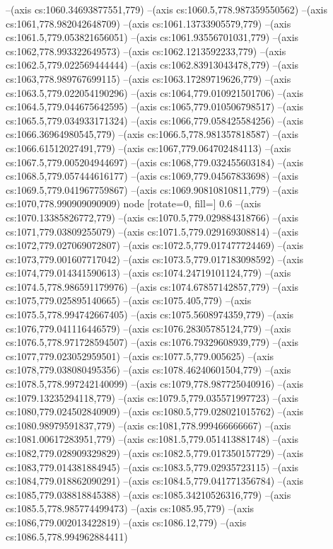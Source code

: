 --(axis cs:1060.34693877551,779)
--(axis cs:1060.5,778.987359550562)
--(axis cs:1061,778.982042648709)
--(axis cs:1061.13733905579,779)
--(axis cs:1061.5,779.053821656051)
--(axis cs:1061.93556701031,779)
--(axis cs:1062,778.993322649573)
--(axis cs:1062.1213592233,779)
--(axis cs:1062.5,779.022569444444)
--(axis cs:1062.83913043478,779)
--(axis cs:1063,778.989767699115)
--(axis cs:1063.17289719626,779)
--(axis cs:1063.5,779.022054190296)
--(axis cs:1064,779.010921501706)
--(axis cs:1064.5,779.044675642595)
--(axis cs:1065,779.010506798517)
--(axis cs:1065.5,779.034933171324)
--(axis cs:1066,779.058425584256)
--(axis cs:1066.36964980545,779)
--(axis cs:1066.5,778.981357818587)
--(axis cs:1066.61512027491,779)
--(axis cs:1067,779.064702484113)
--(axis cs:1067.5,779.005204944697)
--(axis cs:1068,779.032455603184)
--(axis cs:1068.5,779.057444616177)
--(axis cs:1069,779.04567833698)
--(axis cs:1069.5,779.041967759867)
--(axis cs:1069.90810810811,779)
--(axis cs:1070,778.990909090909) node [rotate=0, fill=\bgcol] {0.6}
--(axis cs:1070.13385826772,779)
--(axis cs:1070.5,779.029884318766)
--(axis cs:1071,779.03809255079)
--(axis cs:1071.5,779.029169308814)
--(axis cs:1072,779.027069072807)
--(axis cs:1072.5,779.017477724469)
--(axis cs:1073,779.001607717042)
--(axis cs:1073.5,779.017183098592)
--(axis cs:1074,779.014341590613)
--(axis cs:1074.24719101124,779)
--(axis cs:1074.5,778.986591179976)
--(axis cs:1074.67857142857,779)
--(axis cs:1075,779.025895140665)
--(axis cs:1075.405,779)
--(axis cs:1075.5,778.994742667405)
--(axis cs:1075.5608974359,779)
--(axis cs:1076,779.041116446579)
--(axis cs:1076.28305785124,779)
--(axis cs:1076.5,778.971728594507)
--(axis cs:1076.79329608939,779)
--(axis cs:1077,779.023052959501)
--(axis cs:1077.5,779.005625)
--(axis cs:1078,779.038080495356)
--(axis cs:1078.46240601504,779)
--(axis cs:1078.5,778.997242140099)
--(axis cs:1079,778.987725040916)
--(axis cs:1079.13235294118,779)
--(axis cs:1079.5,779.035571997723)
--(axis cs:1080,779.024502840909)
--(axis cs:1080.5,779.028021015762)
--(axis cs:1080.98979591837,779)
--(axis cs:1081,778.999466666667)
--(axis cs:1081.00617283951,779)
--(axis cs:1081.5,779.051413881748)
--(axis cs:1082,779.028909329829)
--(axis cs:1082.5,779.017350157729)
--(axis cs:1083,779.014381884945)
--(axis cs:1083.5,779.02935723115)
--(axis cs:1084,779.018862090291)
--(axis cs:1084.5,779.041771356784)
--(axis cs:1085,779.038818845388)
--(axis cs:1085.34210526316,779)
--(axis cs:1085.5,778.985774499473)
--(axis cs:1085.95,779)
--(axis cs:1086,779.002013422819)
--(axis cs:1086.12,779)
--(axis cs:1086.5,778.994962884411)
